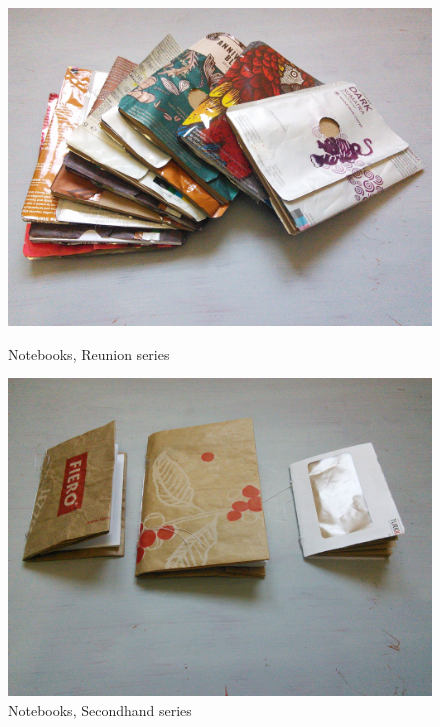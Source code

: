 \begin{figure}[!tbp]
  \centering
  \begin{minipage}[b]{0.48\textwidth}
    \includegraphics[width=\textwidth]{project_graphics/notebooks1.jpg}
    \caption{Notebooks, Reunion series}
    \label{fig:Notebooks1}
  \end{minipage}
  \hfill
  \begin{minipage}[b]{0.48\textwidth}
    \includegraphics[width=\textwidth]{project_graphics/notebooks2.jpg}
    \caption{Notebooks, Secondhand series}
    \label{fig:Notebooks2}
  \end{minipage}
\end{figure}